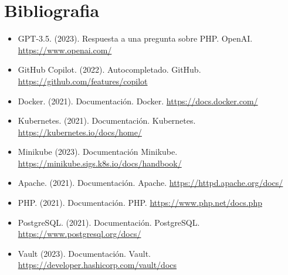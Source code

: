 \documentclass{report}
\begin{document}
    \chapter{Bibliografia}
        \begin{itemize}
            \item GPT-3.5. (2023). Respuesta a una pregunta sobre PHP. OpenAI. \url{https://www.openai.com/}
            \item GitHub Copilot. (2022). Autocompletado. GitHub. \url{https://github.com/features/copilot}
            \item Docker. (2021). Documentación. Docker. \url{https://docs.docker.com/}
            \item Kubernetes. (2021). Documentación. Kubernetes. \url{https://kubernetes.io/docs/home/}
            \item Minikube (2023). Documentación Minikube. \url{https://minikube.sigs.k8s.io/docs/handbook/}
            \item Apache. (2021). Documentación. Apache. \url{https://httpd.apache.org/docs/}
            \item PHP. (2021). Documentación. PHP. \url{https://www.php.net/docs.php}
            \item PostgreSQL. (2021). Documentación. PostgreSQL. \url{https://www.postgresql.org/docs/}
            \item Vault (2023). Documentación. Vault. \url{https://developer.hashicorp.com/vault/docs} 
        \end{itemize}
\end{document}
